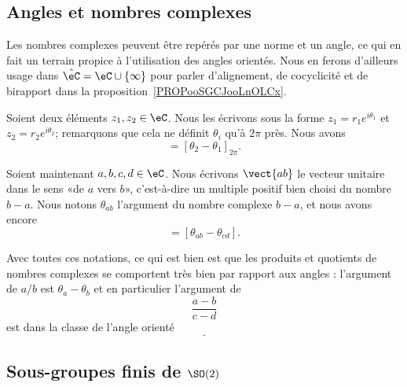 \subsection{Angles et nombres complexes}
\label{SUBSECooKNUVooUBKaWm}

Les nombres complexes peuvent être repérés par une norme et un angle, ce qui en fait un terrain propice à l'utilisation des angles orientés. Nous en ferons d'ailleurs usage dans \( \hat\eC=\eC\cup\{ \infty \}\) pour parler d'alignement, de cocyclicité et de birapport dans la proposition~\ref{PROPooSGCJooLnOLCx}.

Soient deux éléments \( z_1,z_2\in \eC\). Nous les écrivons sous la forme \( z_1=r_1 e^{i\theta_1}\) et \( z_2=r_2 e^{i\theta_2}\); remarquons que cela ne définit \( \theta_i\) qu'à \( 2\pi\) près. Nous avons
\begin{equation}
    [z_1,z_2]=[\theta_2-\theta_1]_{2\pi}.
\end{equation}

Soient maintenant \( a,b,c,d\in \eC\). Nous écrivons \( \vect{ ab }\) le vecteur unitaire dans le sens «de \( a\) vers \( b\)», c'est-à-dire un multiple positif bien choisi du nombre \( b-a\). Nous notons \( \theta_{ab}\) l'argument du nombre complexe \( b-a\), et nous avons encore
\begin{equation}
    [\vect{ ab },\vect{ cd }]=[\theta_{ab}-\theta_{cd}].
\end{equation}

Avec toutes ces notations, ce qui est bien est que les produits et quotients de nombres complexes se comportent très bien par rapport aux angles : l'argument de \( a/b\) est \( \theta_a-\theta_b\) et en particulier l'argument de
\begin{equation}
    \frac{ a-b }{ c-d }
\end{equation}
est dans la classe de l'angle orienté
\begin{equation}
    [\vect{ ba },\vect{ dc }].
\end{equation}

\subsection{Sous-groupes finis de $\SO(2)$}

